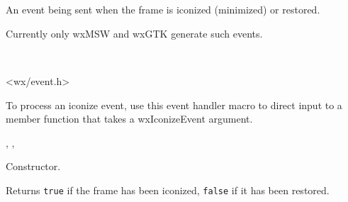 
\section{}\label{wxiconizeevent}

An event being sent when the frame is iconized (minimized) or restored.

Currently only wxMSW and wxGTK generate such events.


\\


<wx/event.h>




To process an iconize event, use this event handler macro to direct input to a
member function that takes a wxIconizeEvent argument.

\twocolwidtha{7cm}
\begin{twocollist}\itemsep=0pt
\end{twocollist}%


,\rtfsp
{},\rtfsp
{}


\label{wxiconizeeventctor}


Constructor.

\label{wxiconizeeventiconized}


Returns {\tt true} if the frame has been iconized, {\tt false} if it has been
restored.

